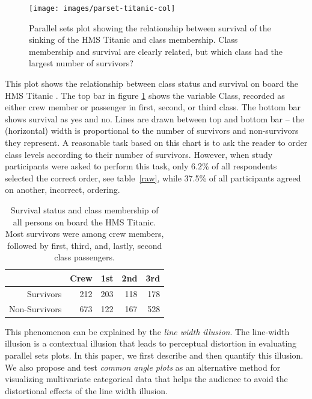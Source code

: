 \documentclass[journal]{vgtc}\usepackage{graphicx, color}
\begin{document}
%
%
\begin{figure}[hbtp]
\centering


{\centering \texttt{[image: images/parset-titanic-col]} 

}




\caption{\label{question1a} Parallel sets plot showing the relationship between survival of the sinking of the HMS Titanic and class membership. Class membership and survival are clearly related, but which class had the largest number of survivors? }
\end{figure}
%
This plot shows the relationship between class status and survival on board the HMS Titanic  \citep{dawson:1995}.  The top bar in figure \ref{question1a} shows the  variable Class, recorded as either crew member or passenger in  first, second, or third class. The bottom bar shows survival  as yes and no.
 Lines are drawn between top and bottom bar -- the  (horizontal) width is proportional to the number of survivors and non-survivors they represent. 
 A reasonable task based on this chart is to ask the reader to order class levels according to their number of survivors. However, when study participants were asked to perform this task, only $6.2\%$ of all respondents 
selected the correct order, see table~\ref{raw}, while 37.5\% of all participants agreed on another, incorrect, ordering.

\begin{table}
\begin{center}
\begin{tabular}{rrrrr}
& Crew & 1st & 2nd & 3rd \\ \hline
Survivors & 212 & 203 & 118 & 178\\
Non-Survivors & 673 & 122 & 167 &  528  
\end{tabular}
\caption{Survival status and class membership of all persons on board the HMS Titanic. 
Most survivors were among  crew members, followed by first, third, and, lastly, second class passengers.  }
\end{center}
\end{table}
This phenomenon can be explained by the \emph{line width illusion}. The line-width illusion is a contextual illusion that leads to perceptual distortion in evaluating parallel sets plots. In this paper, we first describe and then quantify this illusion. We also propose and test \emph{common angle plots} as an alternative  method for visualizing multivariate categorical data that helps the audience to avoid the distortional effects of the line width illusion.
\end{document}
